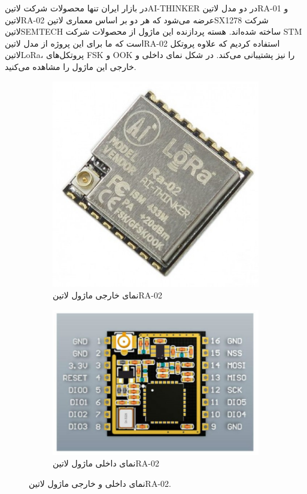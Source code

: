 در بازار ایران تنها محصولات شرکت ‌لاتین{AI-THINKER} در دو مدل ‌لاتین{RA-01} و ‌لاتین{RA-02} عرضه می‌شود که هر دو بر اساس معماری ‌لاتین{SX1278} شرکت ‌لاتین{SEMTECH} ساخته شده‌اند. هسته پردازنده این ماژول از محصولات شرکت STM است که ما برای این پروژه از مدل ‌لاتین{RA-02} استفاده کردیم که علاوه پروتکل ‌لاتین{LoRa}، پروتکل‌های FSK و OOK را نیز پشتیبانی می‌کند. در شکل  نمای داخلی و خارجی این ماژول را مشاهده می‌کنید.

\begin{figure}[H]
	\begin{subfigure}[b]{0.5\textwidth}
		\includegraphics[width=\linewidth]{Assets/loraouter.png}
		\caption{نمای خارجی ماژول ‌لاتین{RA-02}}
		\label{fig:loraouter}
	\end{subfigure}
	\begin{subfigure}[b]{0.5\textwidth}
		\includegraphics[width=\linewidth]{Assets/lorainner.png}
		\caption{نمای داخلی ماژول ‌لاتین{RA-02}}
		\label{fig:lorainner}
	\end{subfigure}
	\caption{نمای داخلی و خارجی ماژول ‌لاتین{RA-02}.}
	\label{fig:loraRA02}
\end{figure}

